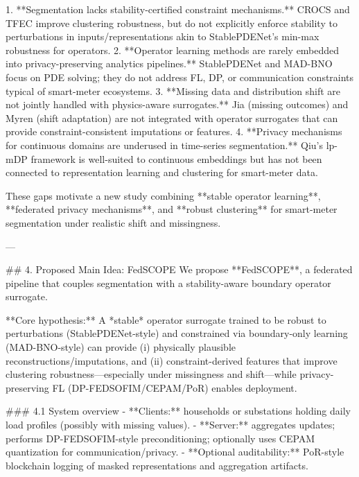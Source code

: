 1. **Segmentation lacks stability-certified constraint mechanisms.** CROCS and TFEC improve clustering robustness, but do not explicitly enforce stability to perturbations in inputs/representations akin to StablePDENet’s min-max robustness for operators.  
2. **Operator learning methods are rarely embedded into privacy-preserving analytics pipelines.** StablePDENet and MAD-BNO focus on PDE solving; they do not address FL, DP, or communication constraints typical of smart-meter ecosystems.  
3. **Missing data and distribution shift are not jointly handled with physics-aware surrogates.** Jia (missing outcomes) and Myren (shift adaptation) are not integrated with operator surrogates that can provide constraint-consistent imputations or features.  
4. **Privacy mechanisms for continuous domains are underused in time-series segmentation.** Qiu’s lp-mDP framework is well-suited to continuous embeddings but has not been connected to representation learning and clustering for smart-meter data.

These gaps motivate a new study combining **stable operator learning**, **federated privacy mechanisms**, and **robust clustering** for smart-meter segmentation under realistic shift and missingness.

---

## 4. Proposed Main Idea: FedSCOPE  
We propose **FedSCOPE**, a federated pipeline that couples segmentation with a stability-aware boundary operator surrogate.

**Core hypothesis:** A *stable* operator surrogate trained to be robust to perturbations (StablePDENet-style) and constrained via boundary-only learning (MAD-BNO-style) can provide (i) physically plausible reconstructions/imputations, and (ii) constraint-derived features that improve clustering robustness—especially under missingness and shift—while privacy-preserving FL (DP-FEDSOFIM/CEPAM/PoR) enables deployment.

### 4.1 System overview  
- **Clients:** households or substations holding daily load profiles (possibly with missing values).  
- **Server:** aggregates updates; performs DP-FEDSOFIM-style preconditioning; optionally uses CEPAM quantization for communication/privacy.  
- **Optional auditability:** PoR-style blockchain logging of masked representations and aggregation artifacts.

